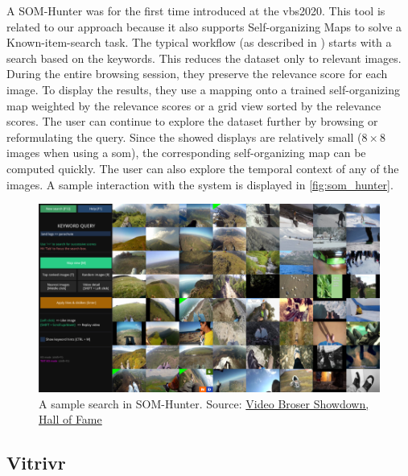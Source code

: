 A SOM-Hunter was for the first time introduced at the \acrshort{vbs}2020. This tool is related to our approach because it also supports Self-organizing Maps to solve a Known-item-search task. The typical workflow (as described in \cite{kratochvil2020som}) starts with a search based on the keywords. This reduces the dataset only to relevant images. During the entire browsing session, they preserve the relevance score for each image. To display the results, they use a mapping onto a trained self-organizing map weighted by the relevance scores or a grid view sorted by the relevance scores. The user can continue to explore the dataset further by browsing or reformulating the query. Since the showed displays are relatively small ($8\times8$ images when using a \acrshort{som}), the corresponding self-organizing map can be computed quickly. The user can also explore the temporal context of any of the images. A sample interaction with the system is displayed in \autoref{fig:som_hunter}.


\begin{figure}
    \centering
    \includegraphics[width=0.99\linewidth]{img/som_hunter_small.png}
    \caption[A sample search in SOM-Hunter]{A sample search in SOM-Hunter. Source: \href{https://videobrowsershowdown.org/hall-of-fame/}{Video Broser Showdown, Hall of Fame}}
    \label{fig:som_hunter}
\end{figure}

\subsection{Vitrivr}

